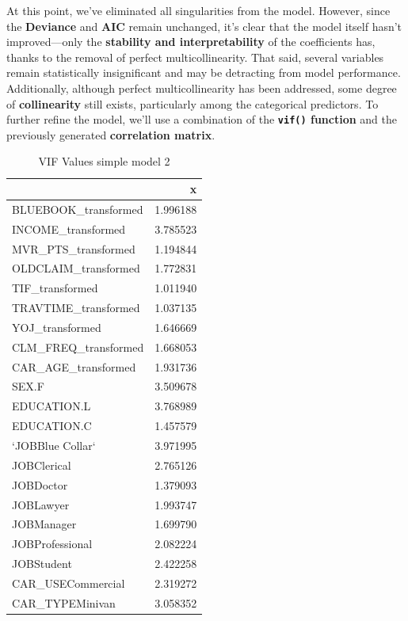 \documentclass[
]{article}
\begin{document}
At this point, we've eliminated all singularities from the model.
However, since the \textbf{Deviance} and \textbf{AIC} remain unchanged,
it's clear that the model itself hasn't improved---only the
\textbf{stability and interpretability} of the coefficients has, thanks
to the removal of perfect multicollinearity. That said, several
variables remain statistically insignificant and may be detracting from
model performance. Additionally, although perfect multicollinearity has
been addressed, some degree of \textbf{collinearity} still exists,
particularly among the categorical predictors. To further refine the
model, we'll use a combination of the \textbf{\texttt{vif()} function}
and the previously generated \textbf{correlation matrix}.

\begin{table}[H]
\centering\centering
\caption{\label{tab:VIF simple_model 2}VIF Values simple model 2}
\centering
\begin{tabular}[t]{l|r}
\hline
  & x\\
\hline
BLUEBOOK\_transformed & 1.996188\\
\hline
INCOME\_transformed & 3.785523\\
\hline
MVR\_PTS\_transformed & 1.194844\\
\hline
OLDCLAIM\_transformed & 1.772831\\
\hline
TIF\_transformed & 1.011940\\
\hline
TRAVTIME\_transformed & 1.037135\\
\hline
YOJ\_transformed & 1.646669\\
\hline
CLM\_FREQ\_transformed & 1.668053\\
\hline
CAR\_AGE\_transformed & 1.931736\\
\hline
SEX.F & 3.509678\\
\hline
EDUCATION.L & 3.768989\\
\hline
EDUCATION.C & 1.457579\\
\hline
`JOBBlue Collar` & 3.971995\\
\hline
JOBClerical & 2.765126\\
\hline
JOBDoctor & 1.379093\\
\hline
JOBLawyer & 1.993747\\
\hline
JOBManager & 1.699790\\
\hline
JOBProfessional & 2.082224\\
\hline
JOBStudent & 2.422258\\
\hline
CAR\_USECommercial & 2.319272\\
\hline
CAR\_TYPEMinivan & 3.058352\\

\end{tabular}
\end{table}
\end{document}
